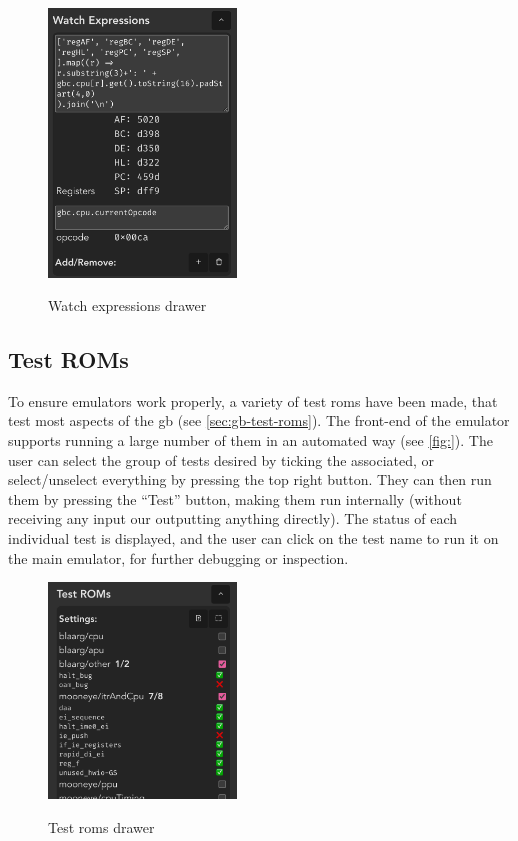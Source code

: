 \documentclass[11pt]{report}
\begin{document}
\begin{figure}[h]
    \centering
    \includegraphics[width=5cm]{images/watch-expressions}\\
    \caption{Watch expressions drawer}
    \label{fig:watch-expressions}
\end{figure}

\subsection{Test ROMs}
\label{sec:testing-ui}

To ensure emulators work properly, a variety of test \glspl{rom} have been made, that test most aspects of the \gls{gb} (see \ref{sec:gb-test-roms}). The front-end of the emulator supports running a large number of them in an automated way (see \ref{fig:}). The user can select the group of tests desired by ticking the associated, or select/unselect everything by pressing the top right button. They can then run them by pressing the ``Test'' button, making them run internally (without receiving any input our outputting anything directly). The status of each individual test is displayed, and the user can click on the test name to run it on the main emulator, for further debugging or inspection.

\begin{figure}[h]
    \centering
    \includegraphics[width=5cm]{images/test-roms}\\
    \caption{Test \glspl{rom} drawer}
    \label{fig:watch-expressions}
\end{figure}
\end{document}
